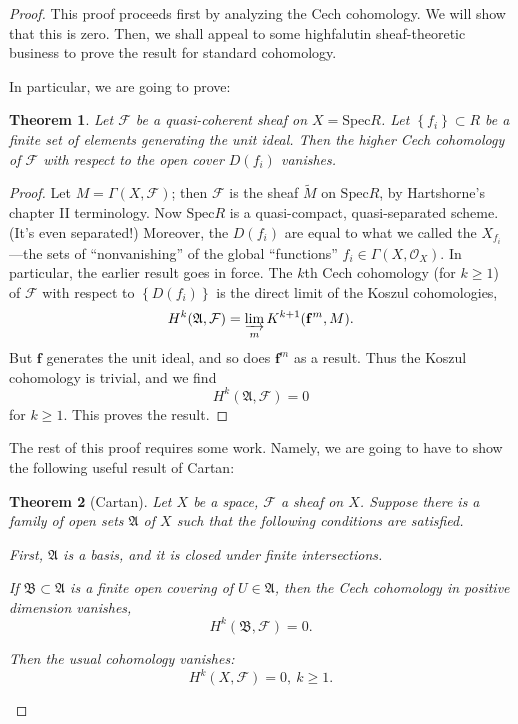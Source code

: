 \documentclass{article}
\newtheorem{theorem}{Theorem}
\begin{document}
\begin{proof} 
This proof proceeds first by analyzing the Cech cohomology. We will show that
this is zero. Then, we shall appeal to some highfalutin sheaf-theoretic
business to prove the result for standard cohomology.

In particular, we are going to prove:
\begin{theorem} 
Let $\mathcal{F}$ be a quasi-coherent sheaf on $X=\mathrm{Spec} R$. Let $\left\{f_i\right\}
\subset R$ be a finite set of elements generating the unit ideal. Then the
higher Cech
cohomology of $\mathcal{F}$ with respect to the open cover $D(f_i)$ vanishes.
\end{theorem} 
\begin{proof} 
Let $M = \Gamma(X, \mathcal{F})$; then $\mathcal{F}$ is the sheaf
$\widetilde{M}$ on $\mathrm{Spec} R$, by Hartshorne's chapter II terminology. 
Now $\mathrm{Spec} R$ is a quasi-compact, quasi-separated scheme. (It's even
separated!) Moreover, the $D(f_i)$ are equal to what we called the
$X_{f_i}$---the sets of ``nonvanishing'' of the global ``functions''  $f_i \in
\Gamma(X, \mathcal{O}_X)$. In particular, the earlier result goes in force. The
$k$th Cech cohomology (for $k \geq 1$) of $\mathcal{F}$ with respect to $\left\{D(f_i)\right\}$
is the direct limit of the Koszul cohomologies,
\[ H^k(\mathfrak{A}, \mathcal{F})=\varinjlim_m K^{k+1}(\mathbf{f}^m , M). \]
But $\mathbf{f}$ generates the unit ideal, and so does $\mathbf{f}^m$ as a
result. Thus the Koszul cohomology is trivial, and we find
\[  H^k(\mathfrak{A}, \mathcal{F}) = 0 \]
for $k \geq 1$. This proves the result.
\end{proof} 

The rest of this proof requires some work. Namely, we are going to have to show
the following useful result of Cartan:

\begin{theorem}[Cartan]
Let $X$ be a space, $\mathcal{F}$  a sheaf on $X$. Suppose there is a family of
open sets $\mathfrak{A} $ of $X$ such that the following conditions are
satisfied.

First, $\mathfrak{A}$ is a basis, and it is closed under finite intersections.

If $\mathfrak{B} \subset \mathfrak{A}$ is a finite open covering of $U \in
\mathfrak{A}$, then the Cech cohomology in positive dimension vanishes,
\[ H^k(\mathfrak{B}, \mathcal{F})=0.  \]

Then the usual cohomology vanishes:
\[ H^k(X, \mathcal{F}) = 0, \ k \geq 1.  \]
\end{theorem} 


\end{proof}
\end{document}
